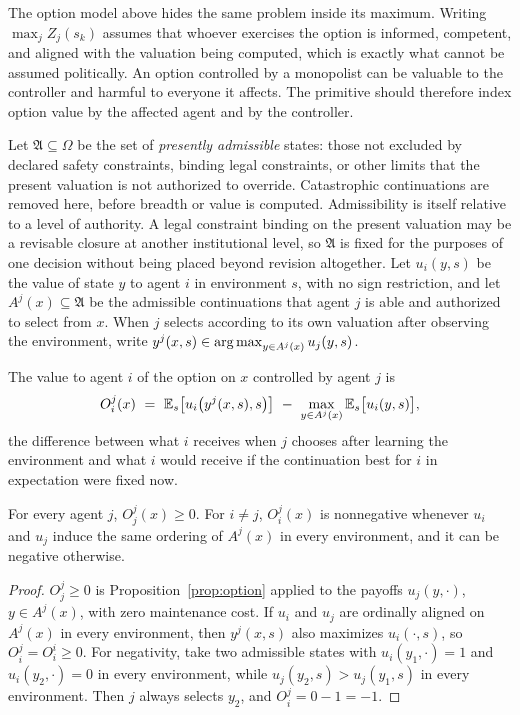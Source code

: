 The option model above hides the same problem inside its maximum. Writing $\max_jZ_j(s_k)$ assumes that whoever exercises the option is informed, competent, and aligned with the valuation being computed, which is exactly what cannot be assumed politically. An option controlled by a monopolist can be valuable to the controller and harmful to everyone it affects. The primitive should therefore index option value by the affected agent and by the controller.

Let $\mathfrak{A}\subseteq\Omega$ be the set of \emph{presently admissible} states: those not excluded by declared safety constraints, binding legal constraints, or other limits that the present valuation is not authorized to override. Catastrophic continuations are removed here, before breadth or value is computed. Admissibility is itself relative to a level of authority. A legal constraint binding on the present valuation may be a revisable closure at another institutional level, so $\mathfrak{A}$ is fixed for the purposes of one decision without being placed beyond revision altogether. Let $u_i(y,s)$ be the value of state $y$ to agent $i$ in environment $s$, with no sign restriction, and let $A^j(x)\subseteq\mathfrak{A}$ be the admissible continuations that agent $j$ is able and authorized to select from $x$. When $j$ selects according to its own valuation after observing the environment, write $y^j(x,s)\in\operatorname*{arg\,max}_{y\in A^j(x)}u_j(y,s)$.

\begin{definition}\label{def:Oij}
The value to agent $i$ of the option on $x$ controlled by agent $j$ is
\begin{equation}\label{eq:Oij}
O_i^j(x)\ =\ \mathbb{E}_s\big[u_i\big(y^j(x,s),s\big)\big]\ -\ \max_{y\in A^j(x)}\mathbb{E}_s\big[u_i(y,s)\big],
\end{equation}
the difference between what $i$ receives when $j$ chooses after learning the environment and what $i$ would receive if the continuation best for $i$ in expectation were fixed now.
\end{definition}

\begin{proposition}\label{prop:whose-option}
For every agent $j$, $O_j^j(x)\geq 0$. For $i\neq j$, $O_i^j(x)$ is nonnegative whenever $u_i$ and $u_j$ induce the same ordering of $A^j(x)$ in every environment, and it can be negative otherwise.
\end{proposition}

\begin{proof}
$O_j^j\geq 0$ is Proposition~\ref{prop:option} applied to the payoffs $u_j(y,\cdot)$, $y\in A^j(x)$, with zero maintenance cost. If $u_i$ and $u_j$ are ordinally aligned on $A^j(x)$ in every environment, then $y^j(x,s)$ also maximizes $u_i(\cdot,s)$, so $O_i^j=O_i^i\geq 0$. For negativity, take two admissible states with $u_i(y_1,\cdot)=1$ and $u_i(y_2,\cdot)=0$ in every environment, while $u_j(y_2,s)>u_j(y_1,s)$ in every environment. Then $j$ always selects $y_2$, and $O_i^j=0-1=-1$.
\end{proof}

